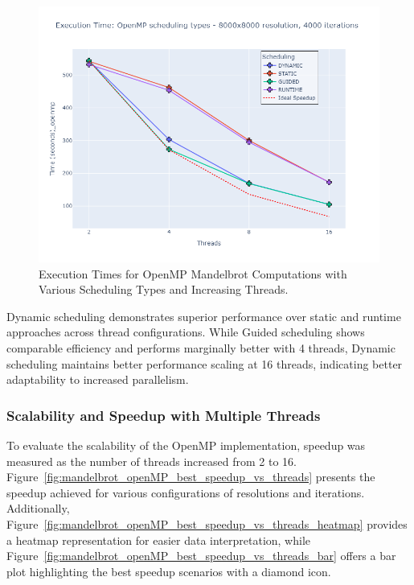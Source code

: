 \documentclass[
	report, %
	11pt, %
]{CSUniSchoolLabReport}
\newcounter{ct}
\begin{document}
\begin{figure}[H]
	\centering
	\captionsetup{justification=centering, width=.8\linewidth}
	\includegraphics[width=\textwidth]{./img/mandelbrot_openMP_scheduling_types_heatmap_speedup.png}
	\caption{Execution Times for OpenMP Mandelbrot Computations with Various Scheduling Types and Increasing Threads.}
	\label{fig:mandelbrot_openMP_scheduling_types_heatmap_speedup}
\end{figure}

Dynamic scheduling demonstrates superior performance over static and runtime approaches across thread configurations. While Guided scheduling shows comparable efficiency and performs marginally better with 4 threads, Dynamic scheduling maintains better performance scaling at 16 threads, indicating better adaptability to increased parallelism.

\subsubsection{Scalability and Speedup with Multiple Threads}

To evaluate the scalability of the OpenMP implementation, speedup was measured as the number of threads increased from 2 to 16. Figure~\ref{fig:mandelbrot_openMP_best_speedup_vs_threads} presents the speedup achieved for various configurations of resolutions and iterations. Additionally, Figure~\ref{fig:mandelbrot_openMP_best_speedup_vs_threads_heatmap} provides a heatmap representation for easier data interpretation, while Figure~\ref{fig:mandelbrot_openMP_best_speedup_vs_threads_bar} offers a bar plot highlighting the best speedup scenarios with a diamond icon.
\end{document}
